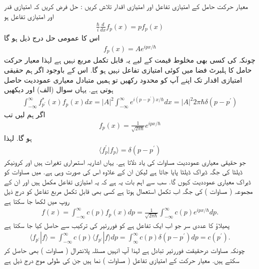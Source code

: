 معیار حرکت حامل کے امتیازی تفاعل اور امتیازی اقدار تلاش کریں
: حل
فرض کریں کہ  امتیازی قدر اور  امتیازی تفاعل ہو
\begin{align}
\frac{\hbar}{i} \frac{d}{dx} f_{p}(x) = pf_{p}(x)
\end{align}
اس کا عمومی حل درج ذیل ہو گا
\begin{align*}
f_{p}(x) = Ae^{ipx/\hbar}
\end{align*}
چونکہ  کی کسی بھی مخلوط قیمت کے لیے یہ قابل تکمل مربع نہیں ہے لہذا معیار حرکت حامل کا ہلبرٹ فضا میں کوئی امتیازی تفاعل نہیں ہو گا. اس کے باوجود اگر ہم حقیقی امتیازی اقدار تک اپنے آپ کو محدود رکھیں تو ہمیں متبادل معیاری عموددیت حاصل ہوتی ہے. یہاں سوال   (الف) اور   دیکھیں
\begin{align}
\int_{-\infty}^{\infty} f_{p^{'}}^{*}(x)f_{p}(x) dx = |A|^{2}\int_{-\infty}^{\infty}e^{i(p-p^{'})x/\hbar} dx = |A|^{2}2\pi\hbar\delta(p-p^{'})
\end{align}
اگر ہم  لیں تب
\begin{align}
f_{p}(x) = \frac{1}{\sqrt{2\pi\hbar}}e^{ipx/\hbar}
\end{align}ہو گا. لہذا
\begin{align}
\langle f_{p}^{'} | f_{p} \rangle = \delta(p-p^{'})
\end{align}
جو حقیقی معیاری عموددیت مساوات  کی یاد دلاتا ہے. یہاں اشاریہ استمراری تغیرات ہیں اور کرونیکر ڈیلٹا کی جگہ ڈیراک ڈیلٹا پایا جاتا ہے لیکن ان کے علاوہ اس کی صورت وہی ہے. میں مساوات  کو ڈیراک معیاری عموددیت کہوں گا. سب سے اہم بات یہ ہے کہ یہ امتیازی تفاعل مکمل ہیں اور ان کے مجموعہ ( مساوات ) کی جگہ اب تکمل استعمال ہوتا ہے کسی بھی قابل تکمل مربع تفاعل  کو درج ذیل روپ میں لکھا جا سکتا ہے
\begin{align}
f(x) = \int_{-\infty}^{\infty} c(p)f_{p}(x)dp = \frac{1}{\sqrt{2\pi\hbar}}\int_{-\infty}^{\infty}c(p)e^{ipx/\hbar}dp. 
\end{align}
پھیلاؤ کا عددی سر جو اب ایک تفاعل ہے  کو فوررئیر کی ترکیب سے حاصل کیا جا سکتا ہے
\begin{align}
\langle f_{p^{'}} | f \rangle = \int_{-\infty}^{\infty} c(p) \langle f_{p^{'}} | f \rangle dp = \int_{\infty}^{\infty}c(p)\delta (p-p^{'}) dp = c(p^{'}).
\end{align}
چونکہ مساوات  درحقیقت فوررئیر تبادل ہے لہذا آپ انہیں مسئلہ پلانشرال ( مساوات ) بھی حاصل کر سکتے ہیں.
معیار حرکت کے امتیازی تفاعل ( مساوات )  نما ہیں جن کی طولی موج درج ذیل ہے
